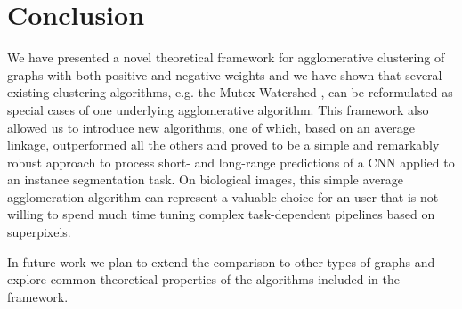 \section{Conclusion}
We have presented a novel theoretical framework for agglomerative clustering of graphs with both positive and negative weights and we have shown that several existing clustering algorithms, e.g. the Mutex Watershed \cite{wolf2018mutex}, can be reformulated as special cases of one underlying agglomerative algorithm. This framework also allowed us to introduce new algorithms, one of which, based on an average linkage, outperformed all the others and proved to be a simple and remarkably robust approach to process short- and long-range predictions of a CNN applied to an instance segmentation task.
On biological images, this simple average agglomeration algorithm can represent a valuable choice for an user that is not willing to spend much time tuning complex task-dependent pipelines based on superpixels. %

In future work we plan to extend the comparison to other types of graphs and explore common theoretical properties of the algorithms included in the framework.
